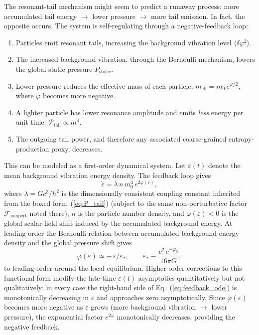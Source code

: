 \documentclass[aps,prd,onecolumn,superscriptaddress,nofootinbib,showpacs,12pt,notitlepage]{revtex4-2}
\newcommand{\meff}{m_{\mathrm{eff}}}
\begin{document}
The resonant-tail mechanism might seem to predict a
runaway process: more accumulated tail energy $\to$ lower pressure
$\to$ more tail emission.  In fact, the opposite occurs.  The
system is self-regulating through a negative-feedback loop:

\begin{enumerate}
  \item Particles emit resonant tails, increasing the
    background vibration level $\langle\delta\varphi^2\rangle$.
  \item The increased background vibration, through the
    Bernoulli mechanism, lowers the global static pressure
    $P_{\mathrm{static}}$.
  \item Lower pressure reduces the effective mass of each
    particle: $\meff = m_0\,e^{\varphi/2}$, where $\varphi$
    becomes more negative.
  \item A lighter particle has lower resonance amplitude
    and emits \emph{less} energy per unit time:
    $\mathcal{P}_{\mathrm{tail}} \propto m^4$.
  \item The outgoing tail power, and therefore any associated
    coarse-grained entropy-production proxy, decreases.
\end{enumerate}

This can be modeled as a first-order dynamical system.
Let $\varepsilon(t)$ denote the mean background vibration
energy density.  The feedback loop gives
\begin{equation}\label{eq:feedback_ode}
  \dot{\varepsilon}
  = \lambda\,n\,m_0^{4}\,e^{2\varphi(\varepsilon)},
\end{equation}
where $\lambda = Gc^{3}/\hbar^{2}$ is the dimensionally
consistent coupling constant inherited from the boxed
form~(\ref{eq:P_tail}) (subject to the same non-perturbative
factor $\mathcal{F}_{\mathrm{nonpert}}$ noted there),
$n$ is the particle number density, and
$\varphi(\varepsilon) < 0$ is the global scalar-field shift
induced by the accumulated background energy.  At leading
order the Bernoulli relation between accumulated background
energy density and the global pressure shift gives
\begin{equation}\label{eq:phi_of_eps}
  \varphi(\varepsilon) \simeq -\,\varepsilon/\varepsilon_{*},
  \qquad
  \varepsilon_{*} \equiv
  \frac{c^{2}\,e^{-\varphi_{0}}}{16\pi G},
\end{equation}
to leading order around the local equilibrium.  Higher-order
corrections to this functional form modify the late-time
$\varepsilon(t)$ asymptotics quantitatively but not
qualitatively: in every case the right-hand side of
Eq.~(\ref{eq:feedback_ode}) is monotonically decreasing in
$\varepsilon$ and approaches zero asymptotically.  Since
$\varphi(\varepsilon)$ becomes more negative as $\varepsilon$
grows (more background vibration $\to$ lower pressure),
the exponential factor $e^{2\varphi}$ monotonically decreases,
providing the negative feedback.
\end{document}
